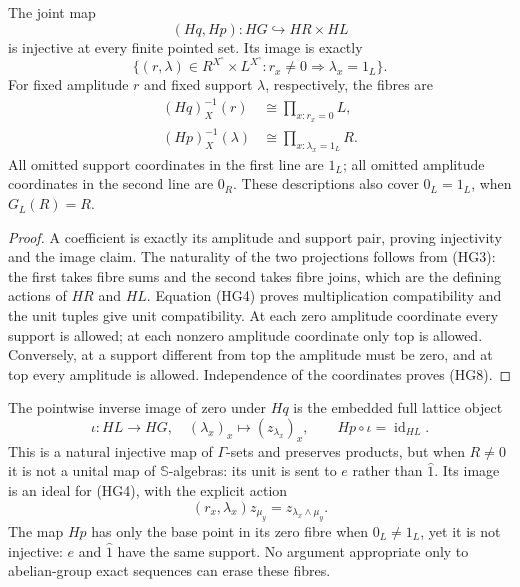 \begin{theorem}\label{HG:joint}
The joint map
\begin{equation}\tag{HG6}
 (Hq,Hp):HG\hookrightarrow HR\times HL
\end{equation}
is injective at every finite pointed set.  Its image is exactly
\begin{equation}\tag{HG7}
 \{(r,\lambda)\in R^{X^\circ}\times L^{X^\circ}:
             r_x\ne0\Longrightarrow\lambda_x=1_L\}.
\end{equation}
For fixed amplitude $r$ and fixed support $\lambda$, respectively,
the fibres are
\begin{equation}\tag{HG8}
 \begin{aligned}
 (Hq)_X^{-1}(r)&\cong\prod_{x:r_x=0}L,\\
 (Hp)_X^{-1}(\lambda)&\cong
                     \prod_{x:\lambda_x=1_L}R.
 \end{aligned}
\end{equation}
All omitted support coordinates in the first line are $1_L$;
all omitted amplitude coordinates in the second line are $0_R$.
These descriptions also cover $0_L=1_L$, when $G_L(R)=R$.
\end{theorem}
\begin{proof}
A coefficient is exactly its amplitude and support pair, proving
injectivity and the image claim.  The naturality of the two
projections follows from (HG3): the first takes fibre sums and
the second takes fibre joins, which are the defining actions of
$HR$ and $HL$.  Equation (HG4) proves multiplication compatibility
and the unit tuples give unit compatibility.  At each zero
amplitude coordinate every support is allowed; at each nonzero
amplitude coordinate only top is allowed.  Conversely, at a
support different from top the amplitude must be zero, and at
top every amplitude is allowed.  Independence of the coordinates
proves (HG8).
\end{proof}

The pointwise inverse image of zero under $Hq$ is the embedded
full lattice object
\begin{equation}\tag{HG9}
 \iota:HL\longrightarrow HG,\quad
       (\lambda_x)_x\longmapsto(z_{\lambda_x})_x,
 \qquad Hp\circ\iota=\operatorname{id}_{HL}.
\end{equation}
This is a natural injective map of $\Gamma$-sets and preserves
products, but when $R\ne0$ it is not a unital map of
$\mathbb S$-algebras: its unit is sent to $e$ rather than
$\widehat1$.  Its image is an ideal for (HG4), with the explicit
action
\begin{equation}\tag{HG10}
 (r_x,\lambda_x)z_{\mu_y}=z_{\lambda_x\wedge\mu_y}.
\end{equation}
The map $Hp$ has only the base point in its zero fibre when
$0_L\ne1_L$, yet it is not injective: $e$ and $\widehat1$ have
the same support.  No argument appropriate only to abelian-group
exact sequences can erase these fibres.


